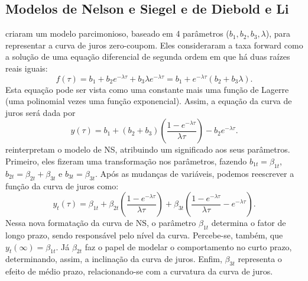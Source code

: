 \documentclass[
	12pt,				%
	openright,			%
	oneside,			%
	a4paper,			%
	english,			%
	brazil				%
	]{dissertacao-ufrgs-abntex2}
\begin{document}




\subsection{Modelos de Nelson e Siegel e de Diebold e Li}

 criaram um modelo parcimonioso, baseado em 4 parâmetros
($b_{1},b_{2},b_{3},\lambda$), para representar a curva de juros
zero-coupom. Eles consideraram a taxa forward como a solução de uma
equação diferencial de segunda ordem em que há duas raízes reais iguais:
\begin{equation}
f(\tau)=b_{1}+b_{2}e^{-\lambda\tau}+b_{3}\lambda e^{-\lambda\tau}=b_1+e^{-\lambda \tau}(b_2+b_3 \lambda).
\end{equation}
Esta equação pode ser vista como uma constante mais uma função de
Lagerre (uma polinomial vezes uma função exponencial). Assim, a equação
da curva de juros será dada por
\begin{equation}
y(\tau)=b_{1}+(b_{2}+b_{3})\left(\frac{1-e^{-\lambda\tau}}{\lambda\tau}\right)-b_{2}e^{-\lambda\tau}.
\end{equation}
 reinterpretam o modelo de NS, atribuindo um significado
aos seus parâmetros. Primeiro, eles fizeram uma transformação nos
parâmetros, fazendo $b_{1t}=\beta_{1t}$, $b_{2t}=\beta_{2t}+\beta_{3t}$
e $b_{3t}=\beta_{3t}$. Após as mudanças de variáveis, podemos reescrever a função da curva de juros como:
\begin{equation}
y_t(\tau)=\beta_{1t}+\beta_{2t}\left(\frac{1-e^{-\lambda\tau}}{\lambda\tau}\right)+\beta_{3t}\left(\frac{1-e^{-\lambda\tau}}{\lambda\tau}-e^{-\lambda\tau}\right).
\end{equation}
Nessa nova formatação da curva de NS, o parâmetro $\beta_{1t}$ determina
o fator de longo prazo, sendo responsável pelo nível da curva. Percebe-se,
também, que $y_{t}(\infty)=\beta_{1t}$. Já $\beta_{2t}$ faz o papel
de modelar o comportamento no curto prazo, determinando, assim, a
inclinação da curva de juros. Enfim, $\beta_{3t}$ representa o efeito
de médio prazo, relacionando-se com a curvatura da curva de juros.
\end{document}
